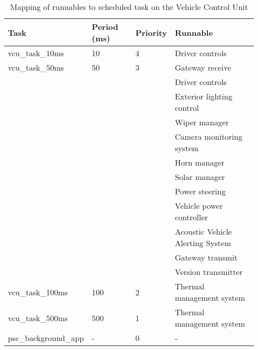 \begin{table}[htb]
    \centering
\begin{tabular}{@{}llll@{}}
    \toprule
    Task                           & Period (ms) & Priority & Runnable                     \\ \midrule
    vcu\_task\_10ms                & 10          & 4        & Driver controls              \\
    vcu\_task\_50ms                & 50          & 3        & Gateway receive              \\
                                   &             &          & Driver controls              \\
                                   &             &          & Exterior lighting control    \\
                                   &             &          & Wiper manager                \\
                                   &             &          & Camera monitoring system     \\
                                   &             &          & Horn manager                 \\
                                   &             &          & Solar manager                \\
                                   &             &          & Power steering               \\
                                   &             &          & Vehicle power controller     \\
                                   &             &          & Acoustic Vehicle Alerting System \\
                                   &             &          & Gateway transmit             \\
                                   &             &          & Version transmitter          \\
    vcu\_task\_100ms               & 100         & 2        & Thermal management system    \\
    vcu\_task\_500ms               & 500         & 1        & Thermal management system    \\
    psc\_background\_app           & -           & 0        & -                            \\ \bottomrule
    \end{tabular}
    \caption{Mapping of runnables to scheduled task on the Vehicle Control Unit}
    \label{tab:runnable_mapping_vcu}
\end{table}

